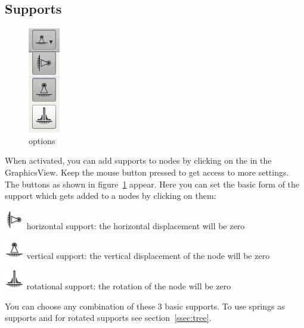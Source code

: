 \documentclass[a4paper,11pt]{report}
\begin{document}
\subsection{Supports}
\begin{minipage}[h]{4cm}
\begin{figure}[H]
\begin{center}
\includegraphics[scale=0.6]{./pictures/support_opt.png}
\caption{options}
\label{pic:support_opt}
\end{center}
\end{figure}
\end{minipage}
\begin{minipage}[h]{\textwidth-4cm}
When activated, you can add supports to nodes by clicking on the in the GraphicsView. Keep the mouse button pressed to get access to more settings. The buttons as shown in figure~\ref{pic:support_opt} appear. Here you can set the basic form of the support which gets added to a nodes by clicking on them:
\begin{trivlist}
	\item[] \includegraphics[scale = 0.5]{../../icons/bearingH.png} horizontal support: the horizontal displacement will be zero
	\item[] \includegraphics[scale = 0.5]{../../icons/bearing.png} vertical support: the vertical displacement of the node will be zero
	\item[] \includegraphics[scale = 0.5]{../../icons/bearingM.png} rotational support: the rotation of the node will be zero
\end{trivlist}
You can choose any combination of these 3 basic supports. To use springs as supports and for rotated supports see section~\ref{ssec:tree}.
\end{minipage}
\end{document}
